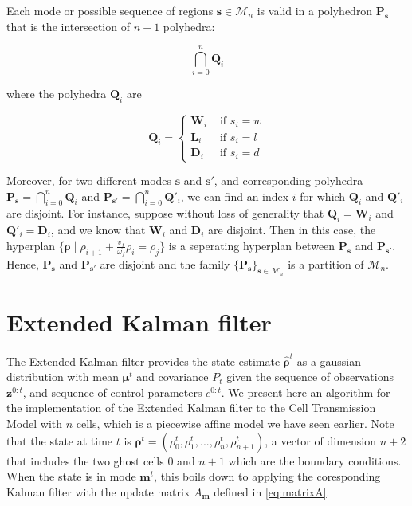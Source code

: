 \documentclass[11pt]{article}
\numberwithin{equation}{section}
\numberwithin{figure}{section}
\numberwithin{table}{section}
\begin{document}
\noindent Each mode or possible sequence of regions $\boldsymbol s \in \mathcal{M}_{n}$ is valid in a polyhedron $\textbf{P}_{\boldsymbol s}$ that is the intersection of $n+1$ polyhedra:

\begin{equation}
\bigcap_{i=0}^{n} \textbf{Q}_{i}
\label{eq:Hrepresentation}
\end{equation}

\noindent where the polyhedra $\textbf{Q}_{i}$ are

\begin{equation}
\textbf{Q}_{i}=
\begin{cases}
\textbf{W}_{i} & \text{ if } s_{i}=w\\
\textbf{L}_{i} & \text{ if } s_{i}=l\\
\textbf{D}_{i} & \text{ if } s_{i}=d
\end{cases}
\label{eq:Hrepresentation2}
\end{equation}


Moreover, for two different modes $\boldsymbol s$ and $\boldsymbol s'$, and corresponding polyhedra $\textbf{P}_{\boldsymbol s}=\bigcap_{i=0}^{n} \textbf{Q}_{i}$ and $\textbf{P}_{\boldsymbol s'}=\bigcap_{i=0}^{n} \textbf{Q}'_{i}$, we can find an index $i$ for which $\textbf{Q}_{i}$ and $\textbf{Q}'_{i}$ are disjoint. For instance, suppose without loss of generality that $\textbf{Q}_{i}=\textbf{W}_{i}$ and $\textbf{Q}'_{i}=\textbf{D}_{i}$, and we know that $\textbf{W}_{i}$ and $\textbf{D}_{i}$ are disjoint. Then in this case, the hyperplan $\{\boldsymbol \rho\mid\rho_{i+1} + \frac{v_{f}}{\omega_{f}}\rho_{i} = \rho_{j}\}$ is a seperating hyperplan between $\textbf{P}_{\boldsymbol s}$ and $\textbf{P}_{\boldsymbol s'}$. Hence, $\textbf{P}_{\boldsymbol s}$ and $\textbf{P}_{\boldsymbol s'}$ are disjoint and the family $\{\textbf{P}_{\boldsymbol s}\}_{\boldsymbol s \in \mathcal{M}_{n}}$ is a partition of $\mathcal{M}_{n}$.


\section{Extended Kalman filter}

The Extended Kalman filter provides the state estimate $\hat{\boldsymbol\rho}^{t}$ as a gaussian distribution with mean $\boldsymbol\mu^{t}$ and covariance $P_{t}$ given the sequence of observations $\boldsymbol z^{0:t}$, and sequence of control parameters $c^{0:t}$. We present here an algorithm for the implementation of the Extended Kalman filter to the Cell Transmission Model with $n$ cells, which is a piecewise affine model we have seen earlier. Note that the state at time $t$ is $\boldsymbol\rho^{t} = (\rho^{t}_{0},\rho^{t}_{1},...,\rho^{t}_{n},\rho^{t}_{n+1})$, a vector of dimension $n+2$ that includes the two ghost cells $0$ and $n+1$ which are the boundary conditions. When the state is in mode $\boldsymbol m^{t}$, this boils down to applying the coresponding Kalman filter with the update matrix $A_{\boldsymbol m}$ defined in \ref{eq:matrixA}.
\end{document}
